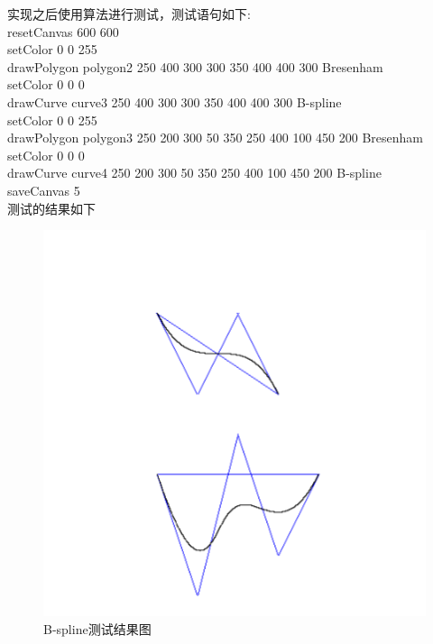 \documentclass[a4paper,UTF8]{article}
\theoremstyle{definition}
\begin{document}
实现之后使用算法进行测试，测试语句如下:\\

resetCanvas 600 600\\

setColor 0 0 255\\

drawPolygon polygon2 250 400 300 300 350 400 400 300 Bresenham\\

setColor 0 0 0\\

drawCurve curve3 250 400 300 300 350 400 400 300 B-spline\\

setColor 0 0 255\\

drawPolygon polygon3 250 200 300 50 350 250 400 100 450 200 Bresenham\\

setColor 0 0 0\\

drawCurve curve4 250 200 300 50 350 250 400 100 450 200 B-spline\\

saveCanvas 5\\

测试的结果如下
\begin{figure}[h]
	\centering
	\includegraphics[scale=0.6]{figure/b-spline-result.png}
	\caption{B-spline测试结果图}
	\label{fig:b-spline-result}
\end{figure}
\end{document}
